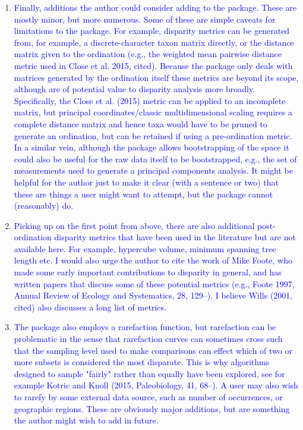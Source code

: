 \documentclass[12pt,letterpaper]{article}
\begin{document}
\begin{enumerate}

\item{\textcolor{blue}{Finally, additions the author could consider adding to the package. These are mostly minor, but more numerous. Some of these are simple caveats for limitations to the package. For example, disparity metrics can be generated from, for example, a discrete-character taxon matrix directly, or the distance matrix given to the ordination (e.g., the weighted mean pairwise distance metric used in Close et al. 2015, cited). Because the package only deals with matrices generated by the ordination itself these metrics are beyond its scope, although are of potential value to disparity analysis more broadly. Specifically, the Close et al. (2015) metric can be applied to an incomplete matrix, but principal coordinates/classic multidimensional scaling requires a complete distance matrix and hence taxa would have to be pruned to generate an ordination, but can be retained if using a pre-ordination metric. In a similar vein, although the package allows bootstrapping of the space it could also be useful for the raw data itself to be bootstrapped, e.g., the set of measurements used to generate a principal components analysis. It might be helpful for the author just to make it clear (with a sentence or two) that these are things a user might want to attempt, but the package cannot (reasonably) do.}}


\item{\textcolor{blue}{Picking up on the first point from above, there are also additional post-ordination disparity metrics that have been used in the literature but are not available here. For example, hypercube volume, minimum spanning tree length etc. I would also urge the author to cite the work of Mike Foote, who made some early important contributions to disparity in general, and has written papers that discuss some of these potential metrics (e.g., Foote 1997, Annual Review of Ecology and Systematics, 28, 129–). I believe Wills (2001, cited) also discusses a long list of metrics.}}


\item{\textcolor{blue}{The package also employs a rarefaction function, but rarefaction can be problematic in the sense that rarefaction curves can sometimes cross such that the sampling level used to make comparisons can effect which of two or more subsets is considered the most disparate. This is why algorithms designed to sample "fairly" rather than equally have been explored, see for example Kotric and Knoll (2015, Paleobiology, 41, 68–). A user may also wish to rarefy by some external data source, such as number of occurrences, or geographic regions. These are obviously major additions, but are something the author might wish to add in future.}}


\end{enumerate}
\end{document}
